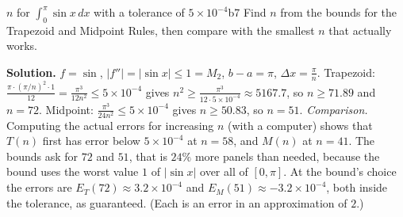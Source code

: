 \documentclass[11pt]{article}
\begin{document}
\begin{exmp}{$n$ for $\int_0^\pi\sin x\,dx$ with a tolerance of $5\times10^{-4}$}{b7}
Find $n$ from the bounds for the Trapezoid and Midpoint Rules, then compare with the smallest $n$ that actually works.

\textbf{Solution.} $f=\sin$, $\lvert f''\rvert=\lvert\sin x\rvert\le1=M_2$, $b-a=\pi$, $\Delta x=\frac\pi n$. Trapezoid: $\frac{\pi\cdot(\pi/n)^2\cdot1}{12}=\frac{\pi^3}{12n^2}\le5\times10^{-4}$ gives $n^2\ge\frac{\pi^3}{12\cdot5\times10^{-4}}\approx5167.7$, so $n\ge71.89$ and $n=72$. Midpoint: $\frac{\pi^3}{24n^2}\le5\times10^{-4}$ gives $n\ge50.83$, so $n=51$.
\emph{Comparison.} Computing the actual errors for increasing $n$ (with a computer) shows that $T(n)$ first has error below $5\times10^{-4}$ at $n=58$, and $M(n)$ at $n=41$. The bounds ask for $72$ and $51$, that is $24\%$ more panels than needed, because the bound uses the worst value $1$ of $\lvert\sin x\rvert$ over all of $[0,\pi]$. At the bound's choice the errors are $E_T(72)\approx3.2\times10^{-4}$ and $E_M(51)\approx-3.2\times10^{-4}$, both inside the tolerance, as guaranteed. (Each is an error in an approximation of $2$.)
\end{exmp}
\end{document}
